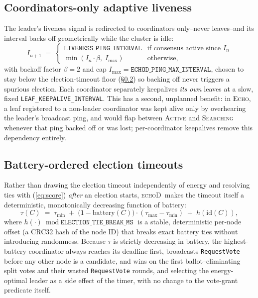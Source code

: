 \documentclass[conference]{IEEEtran}
\newcommand{\echoproto}{\textsc{Echo}\xspace}
\newcommand{\echodproto}{\textsc{echoD}\xspace}
\begin{document}
\subsection{Coordinators-only adaptive liveness}
The leader's liveness signal is redirected to coordinators only--never
leaves--and its interval backs off geometrically while the cluster is
idle:
\begin{equation}
  I_{n+1} \;=\;
  \begin{cases}
    \texttt{LIVENESS\_PING\_INTERVAL} & \text{if consensus active since } I_n \\
    \min(I_n \cdot \beta,\; I_{\max}) & \text{otherwise,}
  \end{cases}
  \label{eq:backoff}
\end{equation}
with backoff factor $\beta{=}2$ and cap $I_{\max}{=}\texttt{ECHOD\_PING\_MAX\_INTERVAL}$,
chosen to stay below the election-timeout floor
(\S\ref{sec:echod-elections}) so backing off never triggers a spurious
election. Each coordinator separately keepalives \emph{its own} leaves
at a slow, fixed \texttt{LEAF\_KEEPALIVE\_INTERVAL}. This has a second,
unplanned benefit: in \echoproto, a leaf registered to a non-leader
coordinator was kept alive only by overhearing the leader's broadcast
ping, and would flap between \textsc{Active} and \textsc{Searching}
whenever that ping backed off or was lost; per-coordinator keepalives
remove this dependency entirely.

\subsection{Battery-ordered election timeouts}\label{sec:echod-elections}
Rather than drawing the election timeout independently of energy and
resolving ties with (\ref{eq:score}) \emph{after} an election starts,
\echodproto\ makes the timeout itself a deterministic, monotonically
decreasing function of battery:
\begin{equation}
  \tau(C) \;=\; \tau_{\min} \;+\; \bigl(1 - \text{battery}(C)\bigr)\cdot
  (\tau_{\max}-\tau_{\min}) \;+\; h(\text{id}(C)),
  \label{eq:echodtimeout}
\end{equation}
where $h(\cdot)\bmod\texttt{ELECTION\_TIE\_BREAK\_MS}$ is a stable,
deterministic per-node offset (a CRC32 hash of the node ID) that breaks
exact battery ties without introducing randomness. Because
$\tau$ is strictly decreasing in battery, the highest-battery
coordinator always reaches its deadline first, broadcasts
\texttt{RequestVote} before any other node is a candidate, and wins on
the first ballot--eliminating split votes and their wasted
\texttt{RequestVote} rounds, and selecting the energy-optimal leader as
a side effect of the timer, with no change to the vote-grant predicate
itself.
\end{document}
